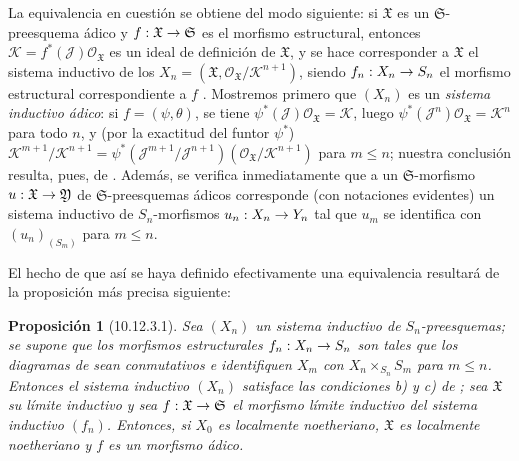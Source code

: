 \documentclass[oneside]{amsart}
\theoremstyle{ega-env-style}
\theoremstyle{ega-thm-env-style}
\newtheorem*{proposition}{Proposición}
\theoremstyle{ega-defn-env-style}
\def\leq{\leqslant}                 %
\renewcommand{\to}{\mathchoice{\longrightarrow}{\rightarrow}{\rightarrow}{\rightarrow}}
\newcommand{\oldpage}[2][]{{\marginnote{\normalfont{\textbf{#1}~|~#2}}}\ignorespaces}
\let\EGAOriginalLabel\label
\renewcommand{\label}[1]{\phantomsection\EGAOriginalLabel{#1}}
\begin{document}
La equivalencia en cuestión se obtiene del modo siguiente:
si $\mathfrak{X}$ es un $\mathfrak{S}$-preesquema ádico y $f:\mathfrak{X}\to\mathfrak{S}$ es el morfismo estructural, entonces $\mathscr{K}=f^*(\mathscr{J})\mathscr{O}_{\mathfrak{X}}$ es un ideal de definición de $\mathfrak{X}$, y se hace corresponder a $\mathfrak{X}$ el sistema inductivo de los $X_n=(\mathfrak{X},\mathscr{O}_{\mathfrak{X}}/\mathscr{K}^{n+1})$, siendo $f_n:X_n\to S_n$ el morfismo estructural correspondiente a $f$ .
Mostremos primero que $(X_n)$ es un \emph{sistema inductivo ádico}:
si $f=(\psi,\theta)$, se tiene $\psi^*(\mathscr{J})\mathscr{O}_{\mathfrak{X}}=\mathscr{K}$, luego $\psi^*(\mathscr{J}^n)\mathscr{O}_{\mathfrak{X}}=\mathscr{K}^n$ para todo $n$, y (por la exactitud del funtor $\psi^*$) $\mathscr{K}^{m+1}/\mathscr{K}^{n+1}
=\psi^*(\mathscr{J}^{m+1}/\mathscr{J}^{n+1})
(\mathscr{O}_{\mathfrak{X}}/\mathscr{K}^{n+1})$ para $m\leq n$;
nuestra conclusión resulta, pues, de .
Además, se verifica inmediatamente que a un $\mathfrak{S}$-morfismo $u:\mathfrak{X}\to\mathfrak{Y}$ de $\mathfrak{S}$-preesquemas ádicos corresponde (con notaciones evidentes)
\oldpage[I]{207}
un sistema inductivo de $S_n$-morfismos $u_n:X_n\to Y_n$ tal que $u_m$ se identifica con $(u_n)_{(S_m)}$ para $m\leq n$.

El hecho de que así se haya definido efectivamente una equivalencia resultará de la proposición más precisa siguiente:

\begin{proposition}[10.12.3.1]
\label{I.10.12.3.1}
Sea $(X_n)$ un sistema inductivo de $S_n$-preesquemas;
se supone que los morfismos estructurales $f_n:X_n\to S_n$ son tales que los diagramas de  sean conmutativos e identifiquen $X_m$ con $X_n\times_{S_n}S_m$ para $m\leq n$.
Entonces el sistema inductivo $(X_n)$ satisface las condiciones \textup{b)} y \textup{c)} de ;
sea $\mathfrak{X}$ su límite inductivo y sea $f:\mathfrak{X}\to\mathfrak{S}$ el morfismo límite inductivo del sistema inductivo $(f_n)$.
Entonces, si $X_0$ es localmente noetheriano, $\mathfrak{X}$ es localmente noetheriano y $f$ es un morfismo ádico.
\end{proposition}
\end{document}
